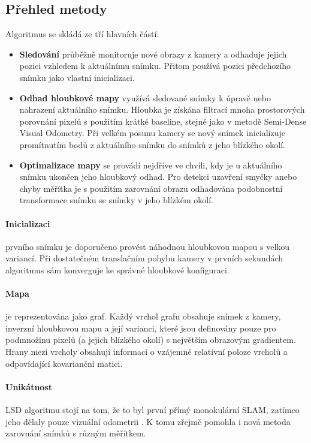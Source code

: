 \documentclass[12pt,a4paper]{report}
\begin{document}
\subsection*{Přehled metody}
Algoritmus se skládá ze tří hlavních částí:
\begin{itemize}
	\item \textbf{Sledování} průběžně monitoruje nové obrazy z kamery a odhaduje jejich pozici vzhledem k aktuálnímu snímku. Přitom používá pozici předchozího snímku jako vlastní inicializaci. 
	\item \textbf{Odhad hloubkové mapy} využívá sledované snímky k úpravě nebo nahrazení aktuálního snímku. Hloubka je získána filtrací mnoha prostorových porovnání pixelů s použitím krátké baseline, stejně jako v metodě Semi-Dense Visual Odometry. Při velkém posunu kamery se nový snímek inicializuje promítnutím bodů z aktuálního snímku do snímků z jeho blízkého okolí. 
	\item \textbf{Optimalizace mapy} se provádí nejdříve ve chvíli, kdy je u aktuálního snímku ukončen jeho hloubkový odhad. Pro detekci uzavření smyčky anebo chyby měřítka je s použitím zarovnání obrazu odhadována podobnostní transformace snímku se snímky v jeho blízkém okolí.
\end{itemize}

\paragraph{Inicializaci} prvního snímku je doporučeno provést náhodnou hloubkovou mapou s velkou variancí. Při dostatečném translačním pohybu kamery v prvních sekundách algoritmus sám konverguje ke správné hloubkové konfiguraci.

\paragraph{Mapa} je reprezentována jako graf. Každý vrchol grafu obsahuje snímek z kamery, inverzní hloubkovou mapu a její varianci, které jsou definovány pouze pro podmnožinu pixelů (a jejich blízkého okolí) s největším obrazovým gradientem. Hrany mezi vrcholy obsahují informaci o vzájemné relativní poloze vrcholů a odpovídající kovarianční matici.

\paragraph{Unikátnost} LSD algoritmu stojí na tom, že to byl první přímý monokulární SLAM, zatímco jeho  dělaly pouze vizuální odometrii \cite{Engel14_LSD}. K tomu zřejmě pomohla i nová metoda zarovnání snímků s různým měřítkem. 
\end{document}
